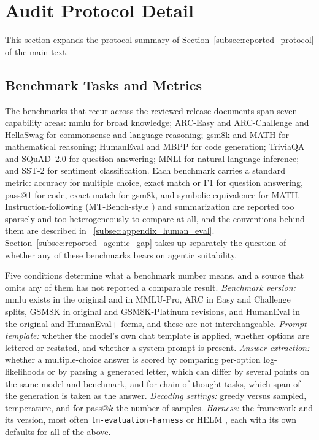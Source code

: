 
\section{Audit Protocol Detail}
\label{supp:audit}

This section expands the protocol summary of Section~\ref{subsec:reported_protocol} of the main text.

\subsection{Benchmark Tasks and Metrics}
\label{subsec:reported_benchmarks}
The benchmarks that recur across the reviewed release documents span seven
capability areas: \gls{mmlu} \citep{hendrycks2021mmlu} for broad knowledge;
ARC-Easy and ARC-Challenge \citep{clark2018arc} and HellaSwag
\citep{zellers2019hellaswag} for commonsense and language reasoning; \gls{gsm8k}
\citep{cobbe2021gsm8k} and MATH \citep{hendrycks2021math} for mathematical
reasoning; HumanEval \citep{chen2021humaneval} and MBPP \citep{austin2021mbpp}
for code generation; TriviaQA \citep{joshi2017triviaqa} and SQuAD~2.0
\citep{rajpurkar2018squad2} for question answering; MNLI \citep{williams2018mnli}
for natural language inference; and SST-2 \citep{socher2013sst} for sentiment
classification. Each benchmark carries a standard metric: accuracy for multiple
choice, exact match or F1 for question answering, pass@1 for code, exact match
for \gls{gsm8k}, and symbolic equivalence for MATH. Instruction-following
(MT-Bench-style \citep{zheng2023mtbench}) and summarization are reported too
sparsely and too heterogeneously to compare at all, and the conventions behind
them are described in \suppsec~\ref{subsec:appendix_human_eval}. Section~\ref{subsec:reported_agentic_gap}
takes up separately the question of whether any of these benchmarks bears on
agentic suitability.

Five conditions determine what a benchmark number means, and a source that omits
any of them has not reported a comparable result. \emph{Benchmark version:}
\gls{mmlu} exists in the original and in MMLU-Pro, ARC in Easy and Challenge
splits, GSM8K in original and GSM8K-Platinum revisions, and HumanEval in the
original and HumanEval+ forms, and these are not interchangeable.
\emph{Prompt template:} whether the model's own chat template is applied,
whether options are lettered or restated, and whether a system prompt is present.
\emph{Answer extraction:} whether a multiple-choice answer is scored by
comparing per-option log-likelihoods or by parsing a generated letter, which can
differ by several points on the same model and benchmark, and for
chain-of-thought tasks, which span of the generation is taken as the answer.
\emph{Decoding settings:} greedy versus sampled, temperature, and for pass@$k$
the number of samples. \emph{Harness:} the framework and its version, most often
\texttt{lm-evaluation-harness} \citep{gao2023harness} or HELM
\citep{liang2023helm}, each with its own defaults for all of the above.

